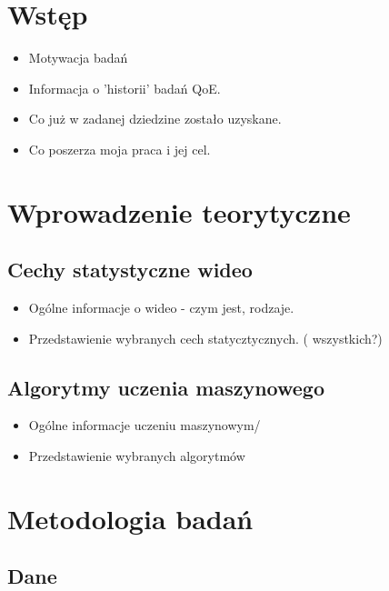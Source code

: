 \chapter{Wstęp}
\label{cha:pierwszyDokument}

\begin{itemize}
\item Motywacja badań
\item Informacja o  'historii' badań QoE.
\item Co już w zadanej dziedzine zostało uzyskane.
\item Co poszerza moja  praca i jej cel.
\end{itemize}


\chapter{Wprowadzenie teorytyczne}
\label{cha:pierwszyDokument}


\section{Cechy statystyczne wideo}

\begin{itemize}
\item Ogólne informacje o wideo - czym jest, rodzaje.
\item Przedstawienie wybranych cech statycztycznych. ( wszystkich?) 
\end{itemize}


\section{Algorytmy uczenia maszynowego }
\label{cha:pierwszyDokument}

\begin{itemize}
\item Ogólne informacje uczeniu maszynowym/
\item Przedstawienie wybranych algorytmów 
\end{itemize}

\chapter{Metodologia badań}
\label{cha:pierwszyDokument}

\section{Dane}
\label{cha:pierwszyDokument}

